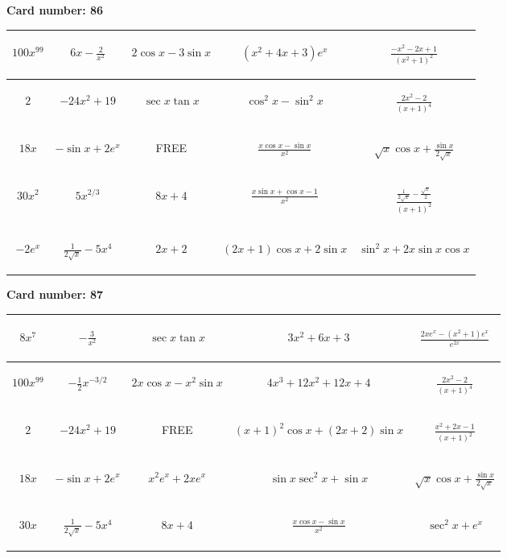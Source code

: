 \documentclass{article}
\newcommand{\entry}[1]{\begin{minipage}[t][2.75cm][t]{4cm} \vspace{1cm} \begin{center}#1\end{center} \end{minipage}}
\newcommand{\freespace}{\entry{FREE}}
\newcommand{\cardnumber}[1]{\noindent \textbf{Card number: #1} \bigskip}
\begin{document}
\pagebreak

\cardnumber{86}
\begin{center}
\begin{tabular}{|*{5}{c|}}
    \hline
    \entry{$100x^{99}$} & \entry{$6x - \frac{2}{x^2}$} & \entry{$2 \cos x - 3 \sin x$} & \entry{$(x^2 + 4x + 3) e^x$} & \entry{$\frac{-x^2 - 2x + 1}{(x^2 + 1)^2}$} \\ \hline
    \entry{$2$} & \entry{$-24x^2 + 19$} & \entry{$\sec x \tan x$} & \entry{$\cos^2 x - \sin^2 x$} & \entry{$\frac{2x^2 - 2}{(x + 1)^4}$} \\ \hline
    \entry{$18x$} & \entry{$-\sin x + 2e^x$} & \freespace & \entry{$\frac{x \cos x - \sin x}{x^2}$} & \entry{$\sqrt{x} \cos x + \frac{\sin x}{2 \sqrt{x}}$} \\ \hline
    \entry{$30x^2$} & \entry{$5x^{2/3}$} & \entry{$8x + 4$} & \entry{$\frac{x \sin x + \cos x - 1}{x^2}$} & \entry{$\frac{\frac{1}{2 \sqrt{x}} - \frac{\sqrt{x}}{2}}{(x + 1)^2}$} \\ \hline
    \entry{$-2e^x$} & \entry{$\frac{1}{2\sqrt{x}} - 5x^4$} & \entry{$2x + 2$} & \entry{$(2x + 1) \cos x + 2 \sin x$} & \entry{$\sin^2 x + 2x \sin x \cos x$} \\ \hline
\end{tabular}
\end{center}

\pagebreak

\cardnumber{87}
\begin{center}
\begin{tabular}{|*{5}{c|}}
    \hline
    \entry{$8x^7$} & \entry{$-\frac{3}{x^2}$} & \entry{$\sec x \tan x$} & \entry{$3x^2 + 6x + 3$} & \entry{$\frac{2x e^x - (x^2 + 1) e^x}{e^{2x}}$} \\ \hline
    \entry{$100x^{99}$} & \entry{$-\frac{1}{2} x^{-3/2}$} & \entry{$2x \cos x - x^2 \sin x$} & \entry{$4x^3 + 12x^2 + 12x + 4$} & \entry{$\frac{2x^2 - 2}{(x + 1)^4}$} \\ \hline
    \entry{$2$} & \entry{$-24x^2 + 19$} & \freespace & \entry{$(x + 1)^2 \cos x + (2x + 2) \sin x$} & \entry{$\frac{x^2 + 2x - 1}{(x + 1)^2}$} \\ \hline
    \entry{$18x$} & \entry{$-\sin x + 2e^x$} & \entry{$x^2 e^x + 2x e^x$} & \entry{$\sin x \sec^2 x + \sin x$} & \entry{$\sqrt{x} \cos x + \frac{\sin x}{2 \sqrt{x}}$} \\ \hline
    \entry{$30x$} & \entry{$\frac{1}{2\sqrt{x}} - 5x^4$} & \entry{$8x + 4$} & \entry{$\frac{x \cos x - \sin x}{x^2}$} & \entry{$\sec^2 x + e^x$} \\ \hline
\end{tabular}
\end{center}
\end{document}
